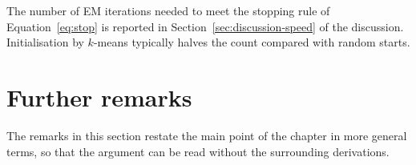 The number of EM iterations needed to meet the stopping rule of
Equation~\eqref{eq:stop} is reported in Section~\ref{sec:discussion-speed}
of the discussion. Initialisation by $k$-means typically halves the count
compared with random starts.

\lipsum[39-40]

\section{Further remarks}\label{sec:further-experiments}

The remarks in this section restate the main point of the chapter in more
general terms, so that the argument can be read without the surrounding
derivations.

\lipsum[111-122]
